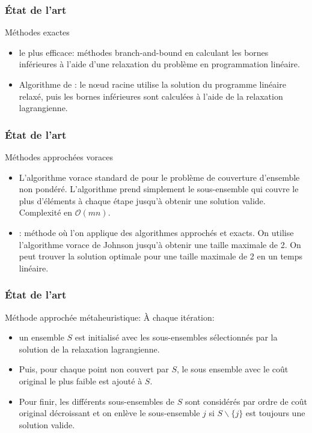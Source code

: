 \documentclass[aspectratio=169,11pt]{beamer}
\begin{document}
	\begin{frame}
		\frametitle{État de l'art}
		\begin{block}{Méthodes exactes}
			\begin{itemize}
				\item le plus efficace: méthodes branch-and-bound en calculant les bornes inférieures à l'aide d'une relaxation du problème en programmation linéaire.~\cite{caprara2000algorithms}
				\item Algorithme de \citeauthor{Beasley1987}: le nœud racine utilise la solution du programme linéaire relaxé, puis les bornes inférieures sont calculées à l'aide de la relaxation lagrangienne.~\cite{Beasley1987}
			\end{itemize}
		\end{block}
	\end{frame}
	\begin{frame}
		\frametitle{État de l'art}
		\begin{block}{Méthodes approchées voraces}
			\begin{itemize}
				\item L'algorithme vorace standard de \citeauthor{Johnson:1973:AAC:800125.804034} pour le problème de couverture d'ensemble non pondéré. L'algorithme prend simplement le sous-ensemble qui couvre le plus d'éléments à chaque étape jusqu'à obtenir une solution valide. Complexité en \(\mathcal{O}(mn)\).~\cite{Johnson:1973:AAC:800125.804034}
				\item \citeauthor{Goldschmidt:1993:MGH:177276.177287}: méthode où l'on applique des
					algorithmes approchés et exacts.
					On utilise l'algorithme vorace de Johnson jusqu'à obtenir une taille maximale de 2.
					On peut trouver la solution optimale pour une taille maximale de 2 en un temps linéaire.~\cite{Goldschmidt:1993:MGH:177276.177287}
			\end{itemize}
		\end{block}
	\end{frame}

	\begin{frame}
		\frametitle{État de l'art}
		\begin{block}{Méthode approchée métaheuristique: \citeauthor{Beasley1990}}
			À chaque itération:
			\begin{itemize}
				\item un ensemble \(S\) est initialisé avec les sous-ensembles sélectionnés par la solution de la relaxation lagrangienne.
				\item Puis, pour chaque point non couvert par \(S\), le sous ensemble avec le coût original le plus faible est ajouté à \(S\).
				\item Pour finir, les différents sous-ensembles de \(S\) sont considérés par ordre de coût original décroissant et on enlève le sous-ensemble \(j\) si \(S \backslash \{j\}\) est toujours une solution valide.~\cite{Beasley1990}
			\end{itemize}
		\end{block}
	\end{frame}
\end{document}
